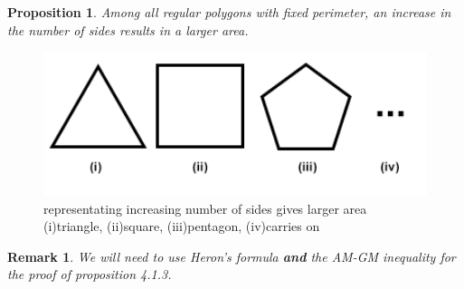 \documentclass[a4paper]{book}
\newtheorem{remark}[theorem]{Remark}%
\newtheorem{proposition}[theorem]{Proposition}%
\numberwithin{theorem}{section}%
\begin{document}
\begin{proposition}
    Among all regular polygons with fixed perimeter, an increase in the number of sides results in a larger area.  
\end{proposition}
\begin{figure}[hbt!]
    \begin{center}   
        \includegraphics[width=140mm]{isofig11}
        \caption{representating increasing number of sides gives larger area (i)triangle, (ii)square, (iii)pentagon, (iv)carries on}
    \end{center}
\end{figure}\leavevmode
\begin{remark}
    We will need to use Heron's formula \textbf{and} the AM-GM inequality for the proof of proposition 4.1.3.
\end{remark}
\end{document}
